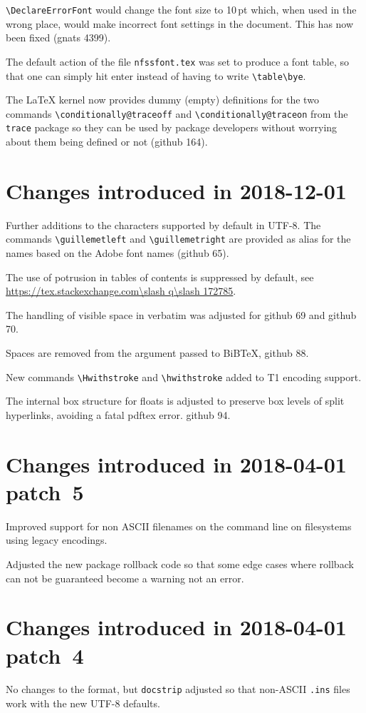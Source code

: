\documentclass{ltxguide}
\newcommand\ghissue[1]{github #1}
\newcommand\gnatsissue[1]{gnats #1}
\newcommand\sxquestion[1]{\url{https://tex.stackexchange.com\slash q\slash #1}}
\newcommand\ghissue[1]{%
    \href{https://github.com/latex3/latex2e/issues/#1}{github #1}}
\newcommand\gnatsissue[1]{%
    \href{https://www.latex-project.org/cgi-bin/ltxbugs2html?pr=latex/#1}{gnats #1}}
\newcommand\sxquestion[1]{%
     \url{https://tex.stackexchange.com/q/#1}}
\begin{document}
\verb|\DeclareErrorFont| would change the font size to 10\,pt which, when
used in the wrong place, would make incorrect font settings in the document.
This has now been fixed (\gnatsissue{4399}).

The default action of the file \texttt{nfssfont.tex} was set to produce a
font table, so that one can simply hit enter instead of having to write
\verb=\table\bye=.

The \LaTeX{} kernel now provides dummy (empty) definitions for the two
commands \verb|\conditionally@traceoff| and
\verb|\conditionally@traceon| from the \texttt{trace} package so they
can be used by package developers without worrying about them being
defined or not (\ghissue{164}).





\section{Changes introduced in 2018-12-01}

Further additions to the characters supported by default in UTF-8.
The commands \verb|\guillemetleft| and \verb|\guillemetright| are
provided as alias for the names based on the Adobe font names
(\ghissue{65}).

The use of potrusion in tables of contents is suppressed by default,
see \sxquestion{172785}.

The handling of visible space in verbatim was adjusted for
\ghissue{69} and \ghissue{70}.

Spaces are removed from the argument passed to BiBTeX, \ghissue{88}.

New commands \verb|\Hwithstroke| and \verb|\hwithstroke| added to T1 encoding support.

The internal box structure for floats is adjusted to preserve box
levels of split hyperlinks, avoiding a fatal pdftex error. \ghissue{94}.


\section{Changes  introduced in 2018-04-01 patch~5}
Improved support for non ASCII filenames on the command line on
filesystems using legacy encodings.

Adjusted the new package rollback code so that some edge cases where rollback
can not be guaranteed become a warning not an error.

\section{Changes  introduced in 2018-04-01 patch~4}
No changes to the format, but \texttt{docstrip} adjusted so that non-ASCII
\texttt{.ins} files work with the new UTF-8 defaults.
\end{document}
